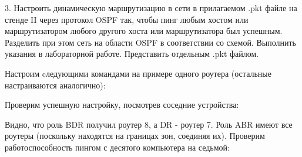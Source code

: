 \Large 3. Настроить динамическую маршрутизацию в сети в прилагаемом .pkt файле на стенде II через протокол OSPF так, чтобы пинг любым хостом или маршрутизатором любого другого хоста или маршрутизатора был успешным. Разделить при этом сеть на области OSPF в соответствии со схемой. Выполнить указания в лабораторной работе.
Представить отдельным .pkt файлом. 

Настроим cледующими командами на примере одного роутера (остальные настраиваются аналогично):

\begin{figure}[h]
\end{figure}

Проверим успешную настройку, посмотрев соседние устройства:

\begin{figure}[h]
\end{figure}

Видно, что роль BDR получил роутер 8, а DR - роутер 7. Роль ABR имеют все роутеры (поскольку находятся на границах зон, соединяя их).
\newpage
Проверим работоспособность пингом с десятого компьютера на седьмой:

\begin{figure}[h]
\end{figure}

